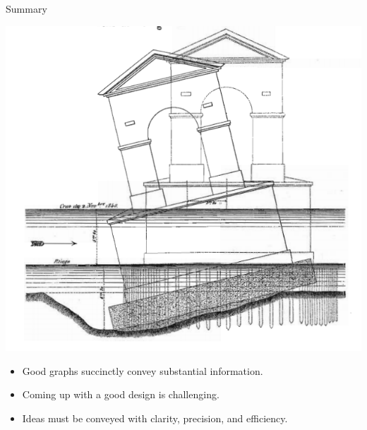 \documentclass[
  ignorenonframetext,
]{beamer}
\begin{document}
\begin{frame}{Summary}
\label{summary}
\begin{minipage}{0.45\textwidth}
\centering
\includegraphics[width=\textwidth]{excellence_figs/fig_35.png}
\end{minipage}
\hfill
\begin{minipage}{0.5\textwidth}
\footnotesize
\begin{itemize}
  \item Good graphs succinctly convey substantial information.
  \item Coming up with a good design is challenging.
  \item Ideas must be conveyed with clarity, precision, and efficiency.
\end{itemize}
\end{minipage}
\end{frame}
\end{document}
